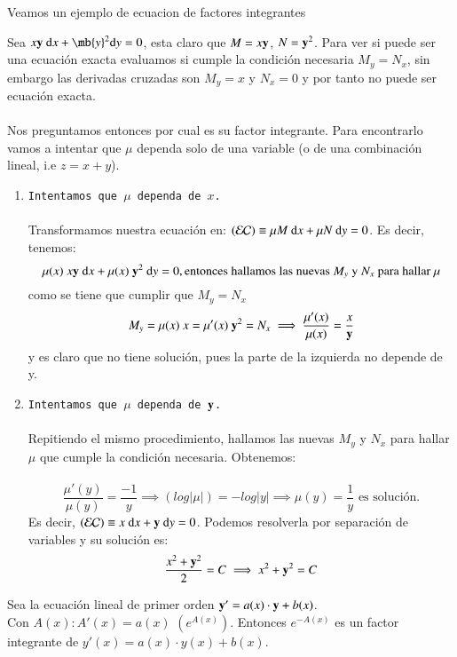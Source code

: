 Veamos un ejemplo de ecuacion de factores integrantes
\begin{eg}
    Sea $x\mbf{y}\ \d x + \mb{y}^2 \d y = 0$, esta claro que $M = x\mathbf{y}$, $N = \mathbf{y}^2$. Para ver si puede ser una ecuación exacta evaluamos si cumple la condición necesaria $M_y = N_x$, sin embargo las derivadas cruzadas son $M_y=x$ y $N_x = 0$ y por tanto no puede ser ecuación exacta.\\\\
    Nos preguntamos entonces por cual es su factor integrante. Para encontrarlo vamos a intentar que $\mu$ dependa solo de una variable (o de una combinación lineal, i.e $z = x+y$).\\
    \begin{enumerate}
        \item \texttt{Intentamos que $\mu$ dependa de $x$.}\\\\
            Transformamos nuestra ecuación en: $(\mathcal{EC})\equiv \mu M\ \mathrm{d} x + \mu N\ \mathrm{d} y = 0$. Es decir, tenemos:
            $$
                \mu(x)\ x\mbf{y}\  \d x + \mu(x)\ \mbf{y}^2\ \d y = 0, \text{entonces hallamos las nuevas $M_y$ y $N_x$ para hallar $\mu$}
            $$
            como se tiene que cumplir que $M_y = N_x$
            $$
                M_y = \mu(x)\ x = \mu'(x)\ \mathbf{y}^2 = N_x \implies \frac{\mu'(x)}{\mu(x)} = \frac{x}{\mathbf{y}}
            $$
            y es claro que no tiene solución, pues la parte de la izquierda no depende de y.
        \item \texttt{Intentamos que $\mu$ dependa de $\mathbf{y}$.}\\\\
        Repitiendo el mismo procedimiento, hallamos las nuevas $M_y$ y $N_x$ para hallar $\mu$ que cumple la condición necesaria. Obtenemos:\\\\
        $$
            \frac{\mu'(y)}{\mu(y)} = \frac{-1}{y} \implies (log |\mu|) = -log |y| \implies \mu(y) = \frac{1}{y} \text{ es solución}.
        $$
        Es decir, $(\mathcal{EC}) \equiv x\ \mathrm{d} x + \mathbf{y}\ \mathrm{d} y = 0$. Podemos resolverla por separación de variables y su solución es:
        $$
            \frac{x^2+\mathbf{y}^2}{2} = C \implies x^2+\mathbf{y}^2 = C
        $$
    \end{enumerate}
\end{eg}

\begin{obs}
    Sea la ecuación lineal de primer orden $\mathbf{y}' = a(x) \cdot \mathbf{y} + b(x)$.\\
    Con $A(x) : A'(x) = a(x)$ $(e^{A(x)})$. %
    Entonces $e^{-A(x)}$ es un factor integrante de $y'(x) = a(x) \cdot y(x) + b(x)$.
\end{obs}

